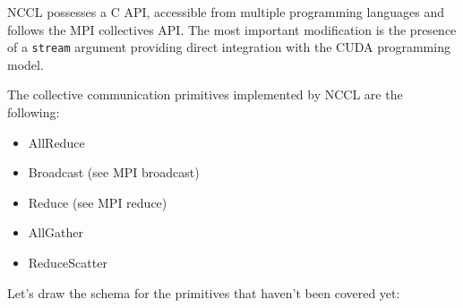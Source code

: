 \documentclass{article}
\begin{document}
NCCL possesses a C API, accessible from multiple programming languages and follows the MPI collectives API. The most important modification is the presence of a \lstinline{stream} argument providing direct integration with the CUDA programming model.

The collective communication primitives implemented by NCCL are the following:
\begin{itemize}
  \item AllReduce
  \item Broadcast (see MPI broadcast)
  \item Reduce (see MPI reduce)
  \item AllGather
  \item ReduceScatter
\end{itemize}

Let's draw the schema for the primitives that haven't been covered yet:
\end{document}
